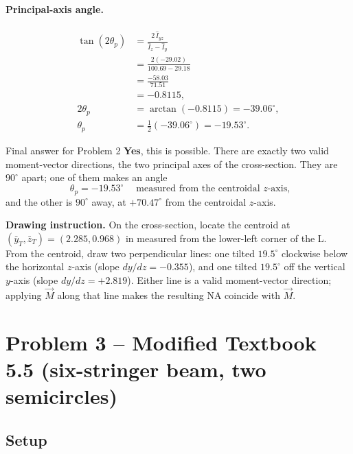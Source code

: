 \documentclass[11pt]{article}
\begin{document}
\paragraph{Principal-axis angle.}
\begin{align*}
\tan(2\theta_p) &= \frac{2\,\hat I_{yz}}{\hat I_z - \hat I_y}\\
                &= \frac{2(-29.02)}{100.69 - 29.18}\\
                &= \frac{-58.03}{71.51}\\
                &= -0.8115,\\[2pt]
2\theta_p &= \arctan(-0.8115) = -39.06^\circ,\\
\theta_p &= \tfrac{1}{2}(-39.06^\circ) = -19.53^\circ.
\end{align*}

\begin{answerbox}{Final answer for Problem 2}
\textbf{Yes}, this is possible. There are exactly two valid moment-vector directions, the two principal axes of the cross-section. They are $90^\circ$ apart; one of them makes an angle
\[
\boxed{\;\theta_p = -19.53^\circ\;}\quad\text{measured from the centroidal $z$-axis,}
\]
and the other is $90^\circ$ away, at $+70.47^\circ$ from the centroidal $z$-axis.

\textbf{Drawing instruction.} On the cross-section, locate the centroid at $(\bar y_T, \bar z_T) = (2.285, 0.968)$ in measured from the lower-left corner of the L. From the centroid, draw two perpendicular lines: one tilted $19.5^\circ$ clockwise below the horizontal $z$-axis (slope $dy/dz = -0.355$), and one tilted $19.5^\circ$ off the vertical $y$-axis (slope $dy/dz = +2.819$). Either line is a valid moment-vector direction; applying $\vec M$ along that line makes the resulting NA coincide with $\vec M$.
\end{answerbox}

\section*{Problem 3 -- Modified Textbook 5.5 (six-stringer beam, two semicircles)}

\subsection*{Setup}
\end{document}
